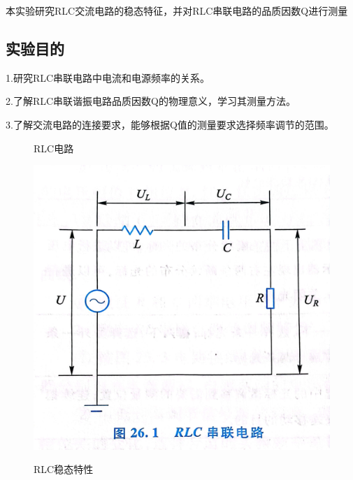 \documentclass{ctexart}
\begin{document}
  本实验研究RLC交流电路的稳态特征，并对RLC串联电路的品质因数Q进行测量

  \subsection{实验目的}
  1.\quad 研究RLC串联电路中电流和电源频率的关系。

  2.\quad 了解RLC串联谐振电路品质因数Q的物理意义，学习其测量方法。
  
  3.\quad 了解交流电路的连接要求，能够根据Q值的测量要求选择频率调节的范围。

\begin{figure}[H]
  \begin{minipage}[H]{0.5\textwidth}\label{rlcdianlu}
  \centering
  \caption{RLC电路}
  \includegraphics[width=\textwidth]{RLCdianlu.jpg}
  \end{minipage}
  \hfill
  \begin{minipage}[H]{0.5\textwidth}\label{rlcwentaitexing}
  \centering
  \caption{RLC稳态特性}

\end{minipage}
\end{figure}
\end{document}
